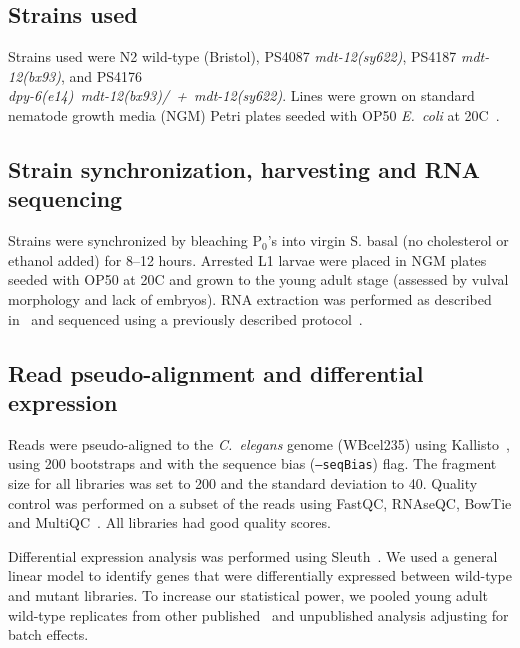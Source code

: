\documentclass[8pt, twocolumn]{article}
\newcommand{\cel}{\emph{C.~elegans}}
\newcommand{\ecol}{\emph{E.~coli}}
\newcommand{\gene}[1]{\mbox{\emph{#1}}}
\begin{document}
\subsection*{Strains used}
Strains used were N2 wild-type (Bristol),
PS4087 \gene{mdt-12(sy622)},
PS4187 \gene{mdt-12(bx93)},
and PS4176\\ \gene{dpy-6(e14) mdt-12(bx93)/ + mdt-12(sy622)}.
Lines were grown on standard nematode growth media (NGM) Petri plates seeded
with OP50 \ecol{} at 20\degree{}C~\cite{Brenner1974}.

\subsection*{Strain synchronization, harvesting and RNA sequencing}
Strains were synchronized by bleaching P$_0$'s into virgin S. basal (no
cholesterol or ethanol added) for 8--12 hours. Arrested L1 larvae were placed in
NGM plates seeded with OP50 at 20\degree{}C and grown to the young adult stage
(assessed by vulval morphology and lack of embryos). RNA extraction was
performed as described in~\cite{AngelesAlboresHIF} and sequenced using a
previously described protocol~\cite{Angeles-Albores2017}.

\subsection*{Read pseudo-alignment and differential expression}
Reads were pseudo-aligned to the \cel{} genome (WBcel235) using
Kallisto~\cite{Bray2016}, using 200 bootstraps and with the sequence bias
(\texttt{--seqBias}) flag. The fragment size for all libraries was set to 200
and the standard deviation to 40. Quality control was performed on a subset of
the reads using FastQC, RNAseQC, BowTie and
MultiQC~\cite{Andrews2010,Deluca2012,Langmead2009,Ewels2016}. All libraries had
good quality scores.

Differential expression analysis was performed using
Sleuth~\cite{Pimentel2016a}. We used a general linear model to identify
genes that were differentially expressed between wild-type and mutant libraries.
To increase our statistical power, we pooled young adult wild-type replicates
from other published~\cite{AngelesAlboresHIF,Angeles-Albores2017} and unpublished
analysis adjusting for batch effects.
\end{document}
